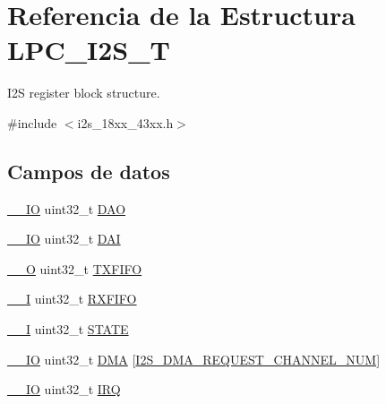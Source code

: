 \hypertarget{struct_l_p_c___i2_s___t}{}\section{Referencia de la Estructura L\+P\+C\+\_\+\+I2\+S\+\_\+T}
\label{struct_l_p_c___i2_s___t}


I2S register block structure.  




{\ttfamily \#include $<$i2s\+\_\+18xx\+\_\+43xx.\+h$>$}

\subsection*{Campos de datos}
\begin{DoxyCompactItemize}
\item 
\hyperlink{core__sc300_8h_aec43007d9998a0a0e01faede4133d6be}{\+\_\+\+\_\+\+IO} uint32\+\_\+t \hyperlink{struct_l_p_c___i2_s___t_ab2642f94f4e47c8fa2ce148e2741d070}{D\+AO}
\item 
\hyperlink{core__sc300_8h_aec43007d9998a0a0e01faede4133d6be}{\+\_\+\+\_\+\+IO} uint32\+\_\+t \hyperlink{struct_l_p_c___i2_s___t_a3181fde20c2b3e5250a1b776aed89b0b}{D\+AI}
\item 
\hyperlink{core__sc300_8h_a7e25d9380f9ef903923964322e71f2f6}{\+\_\+\+\_\+O} uint32\+\_\+t \hyperlink{struct_l_p_c___i2_s___t_a7135d06efef563cc37dd1ac53247af33}{T\+X\+F\+I\+FO}
\item 
\hyperlink{core__sc300_8h_af63697ed9952cc71e1225efe205f6cd3}{\+\_\+\+\_\+I} uint32\+\_\+t \hyperlink{struct_l_p_c___i2_s___t_ab8607f5638e22b5060695ea306835e56}{R\+X\+F\+I\+FO}
\item 
\hyperlink{core__sc300_8h_af63697ed9952cc71e1225efe205f6cd3}{\+\_\+\+\_\+I} uint32\+\_\+t \hyperlink{struct_l_p_c___i2_s___t_add23853bd7ab6e0c9e57fc63b7403d45}{S\+T\+A\+TE}
\item 
\hyperlink{core__sc300_8h_aec43007d9998a0a0e01faede4133d6be}{\+\_\+\+\_\+\+IO} uint32\+\_\+t \hyperlink{struct_l_p_c___i2_s___t_a1cc9b28bd861dbde0b65743b406f1977}{D\+MA} \mbox{[}\hyperlink{group___i2_s__18_x_x__43_x_x_ggac04c1583101ddd661886d9677683421bab9921186ab93fee889b2074d508b88ce}{I2\+S\+\_\+\+D\+M\+A\+\_\+\+R\+E\+Q\+U\+E\+S\+T\+\_\+\+C\+H\+A\+N\+N\+E\+L\+\_\+\+N\+UM}\mbox{]}
\item 
\hyperlink{core__sc300_8h_aec43007d9998a0a0e01faede4133d6be}{\+\_\+\+\_\+\+IO} uint32\+\_\+t \hyperlink{struct_l_p_c___i2_s___t_a2f731d3cfedec4a4e11aa90b19784633}{I\+RQ}

\end{DoxyCompactItemize}
